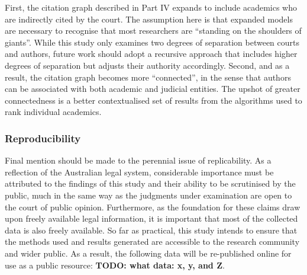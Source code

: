 First, the citation graph described in Part IV expands to include academics who are indirectly cited by the court. The assumption here is that expanded models are necessary to recognise that most researchers are ``standing on the shoulders of giants''. While this study only examines two degrees of separation between courts and authors, future work should adopt a recursive approach that includes higher degrees of separation but adjusts their authority accordingly. Second, and as a result, the citation graph becomes more ``connected'', in the sense that authors can be associated with both academic and judicial entities. The upshot of greater connectedness is a better contextualised set of results from the algorithms used to rank individual academics.


\subsubsection{Reproducibility}

Final mention should be made to the perennial issue of replicability. As a reflection of the Australian legal system, considerable importance must be attributed to the findings of this study and their ability to be scrutinised by the public, much in the same way as the judgments under examination are open to the court of public opinion. Furthermore, as the foundation for these claims draw upon freely available legal information, it is important that most of the collected data is also freely available. So far as practical, this study intends to ensure that the methods used and results generated are accessible to the research community and wider public. As a result, the following data will be re-published online for use as a public resource: \textbf{TODO: what data: x, y, and Z}.


